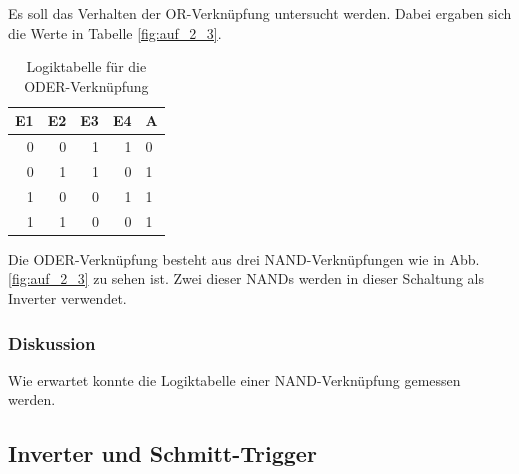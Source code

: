 \documentclass[12pt,a4paper]{article}
\begin{document}
Es soll das Verhalten der OR-Verknüpfung untersucht werden. Dabei ergaben sich die Werte in Tabelle \ref{fig:auf_2_3}.

\begin{table}[H]
\begin{center}
\begin{tabular}{r|r|r|r|l}

\multicolumn{1}{l|}{E1} & \multicolumn{1}{l|}{E2} & \multicolumn{1}{l|}{E3} & \multicolumn{1}{l|}{E4} & A \\ \hline \hline
0 & 0 & 1 & 1 & 0 \\ 
0 & 1 & 1 & 0 & 1 \\ 
1 & 0 & 0 & 1 & 1 \\ 
1 & 1 & 0 & 0 & 1 \\ 
\end{tabular}
\end{center}
\caption{Logiktabelle für die ODER-Verknüpfung}
\label{tab:2_3}
\end{table}

Die ODER-Verknüpfung besteht aus drei NAND-Verknüpfungen wie in Abb. \ref{fig:auf_2_3} zu sehen ist. Zwei dieser NANDs werden in dieser Schaltung als Inverter verwendet.

\subsubsection*{Diskussion}

Wie erwartet konnte die Logiktabelle einer NAND-Verknüpfung gemessen werden.

\subsection{Inverter und Schmitt-Trigger}
\end{document}
